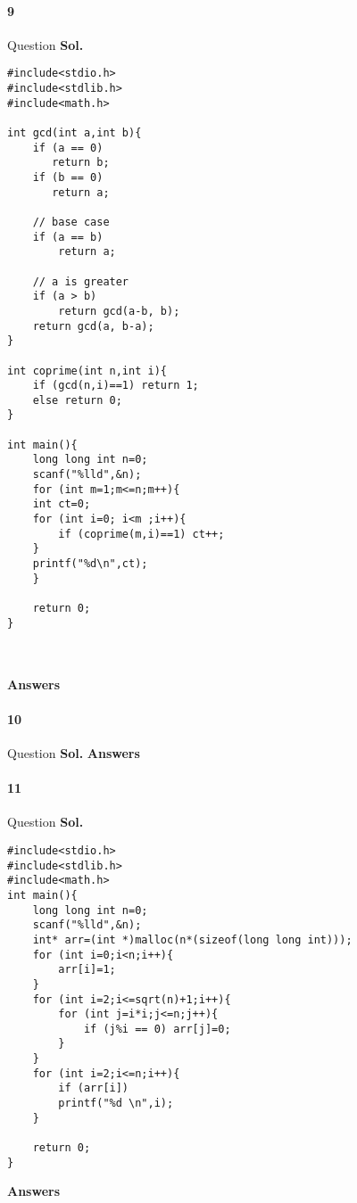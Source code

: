 \documentclass[12pt]{amsart}
\begin{document}
\paragraph*{9} Question
\bigskip
\textbf{Sol.} \\
\begin{verbatim}
#include<stdio.h>
#include<stdlib.h>
#include<math.h>

int gcd(int a,int b){
    if (a == 0)
       return b;
    if (b == 0)
       return a;
 
    // base case
    if (a == b)
        return a;
 
    // a is greater
    if (a > b)
        return gcd(a-b, b);
    return gcd(a, b-a);
}

int coprime(int n,int i){
    if (gcd(n,i)==1) return 1;
    else return 0;
}

int main(){
    long long int n=0;
    scanf("%lld",&n);
    for (int m=1;m<=n;m++){
    int ct=0;
    for (int i=0; i<m ;i++){
        if (coprime(m,i)==1) ct++;
    }
    printf("%d\n",ct);
    }
    
    return 0;
}
 
\end{verbatim}
\\
\textbf{Answers}\\
\bigskip
\paragraph*{10} Question
\bigskip
\textbf{Sol.} \textbf{Answers}\\
\bigskip
\paragraph*{11} Question
\bigskip
\textbf{Sol.} \\
\begin{verbatim}
#include<stdio.h>
#include<stdlib.h>
#include<math.h>
int main(){
    long long int n=0;
    scanf("%lld",&n);
    int* arr=(int *)malloc(n*(sizeof(long long int)));
    for (int i=0;i<n;i++){
        arr[i]=1;
    }
    for (int i=2;i<=sqrt(n)+1;i++){
        for (int j=i*i;j<=n;j++){
            if (j%i == 0) arr[j]=0;
        }
    }
    for (int i=2;i<=n;i++){
        if (arr[i])
        printf("%d \n",i);
    }
    
    return 0;
}
\end{verbatim}

\textbf{Answers}\\
\end{document}
